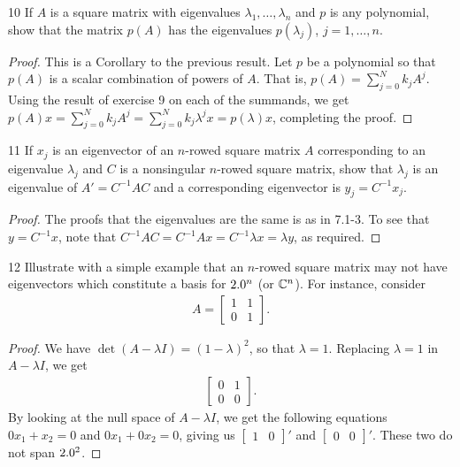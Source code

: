 \begin{exercise}{10}
If $A$ is a square matrix with eigenvalues $\lambda_1, \dots, \lambda_n$ and $p$ is any polynomial, show that the matrix $p(A)$ has the eigenvalues $p(\lambda_j)$, $j = 1, \dots, n$.
\end{exercise}
\begin{proof}
This is a Corollary to the previous result.
Let $p$ be a polynomial so that $p(A)$ is a scalar combination of powers of $A$.
That is, $p(A) = \sum_{j=0}^N k_j A^j$.
Using the result of exercise 9 on each of the summands, we get $p(A) x = \sum_{j=0}^N k_j A^j = \sum_{j=0}^N k_j \lambda^j x = p(\lambda) x$, completing the proof.
\end{proof} 

\begin{exercise}{11}
If $x_j$ is an eigenvector of an $n$-rowed square matrix $A$ corresponding to an eigenvalue $\lambda_j$ and $C$ is a nonsingular $n$-rowed square matrix, show that $\lambda_j$ is an eigenvalue of $A' = C^{-1} A C$ and a corresponding eigenvector is $y_j = C^{-1}x_j$.
\end{exercise}
\begin{proof}
The proofs that the eigenvalues are the same is as in 7.1-3.
To see that $y = C^{-1} x$, note that $C^{-1} A C = C^{-1} A x = C^{-1} \lambda x = \lambda y$, as required.
\end{proof} 

\begin{exercise}{12}
Illustrate with a simple example that an $n$-rowed square matrix may not have eigenvectors which constitute a basis for $2.0^n$ (or $\mathbb{C}^n$).
For instance, consider
\begin{align*}
    A =
    \begin{bmatrix}
        1 & 1\\
        0 & 1
    \end{bmatrix}.
\end{align*}
\end{exercise}
\begin{proof}
We have $\det (A - \lambda I) = (1 - \lambda)^2$, so that $\lambda = 1$.
Replacing $\lambda = 1$ in $A - \lambda I$, we get
\begin{align*}
    \begin{bmatrix}
        0 & 1\\
        0 & 0
    \end{bmatrix}.
\end{align*}
By looking at the null space of $A - \lambda I$, we get the following equations $0x_1 + x_2 = 0$ and $0x_1 + 0x_2 = 0$, giving us $\begin{bmatrix} 1 & 0\end{bmatrix}'$ and $\begin{bmatrix} 0 & 0 \end{bmatrix}'$.
These two do not span $2.0^2$.
\end{proof} 
